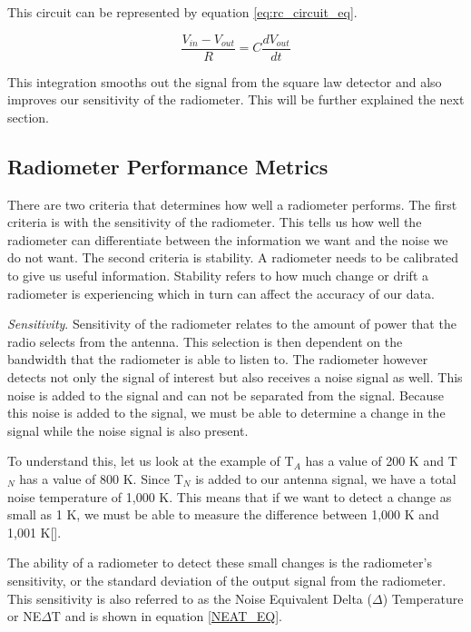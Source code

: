 This circuit can be represented by equation \ref{eq:rc_circuit_eq}.

\begin{equation}\label{eq:rc_circuit_eq}
\frac{V_{in}-V_{out}}{R}=C\frac{dV_{out}}{dt}
\end{equation}

This integration smooths out the signal from the square law detector and also improves our sensitivity of the radiometer.  This will be further explained the next section.

\subsection{Radiometer Performance Metrics}
There are two criteria that determines how well a radiometer performs.  The first criteria is with the sensitivity of the radiometer.  This tells us how well the radiometer can differentiate between the information we want and the noise we do not want.  The second criteria is stability.  A radiometer needs to be calibrated to give us useful information.  Stability refers to how much change or drift a radiometer is experiencing which in turn can affect the accuracy of our data.  

\emph{Sensitivity}.  Sensitivity of the radiometer relates to the amount of power that the radio selects from the antenna.  This selection is then dependent on the bandwidth that the radiometer is able to listen to.  The radiometer however detects not only the signal of interest but also receives a noise signal as well.  This noise is added to the signal and can not be separated from the signal.  Because this noise is added to the signal, we must be able to determine a change in the signal while the noise signal is also present.  

To understand this, let us look at the example of T$_{A}$ has a value of 200 K and T$_{N}$ has a value of 800 K.  Since T$_{N}$ is added to our antenna signal, we have a total noise temperature of 1,000 K.  This means that if we want to detect a change as small as 1 K, we must be able to measure the difference between 1,000 K and 1,001 K[\cite{skou}].


The ability of a radiometer to detect these small changes is the radiometer's sensitivity, or the standard deviation of the output signal from the radiometer.  This sensitivity is also referred to as the Noise Equivalent Delta ($\Delta$) Temperature or NE$\Delta$T and is shown in equation \ref{NEAT_EQ}. 

